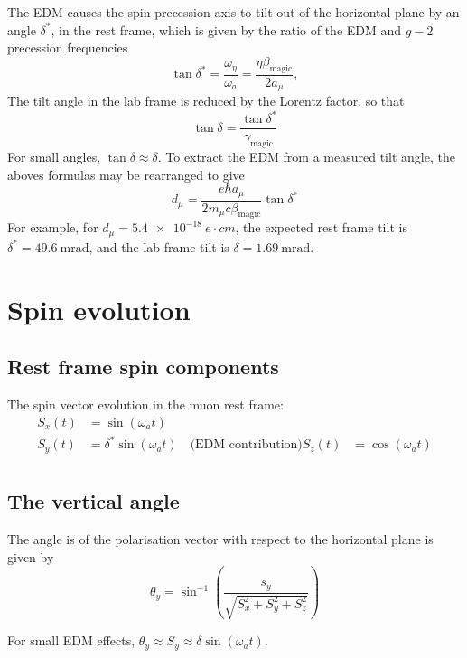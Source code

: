 \documentclass[11pt]{article}
\begin{document}
The EDM causes the spin precession axis to tilt out of the horizontal plane by an angle $\delta^{*}$, in the rest frame, which is given by the ratio of the EDM and $g-2$ precession frequencies
%
\begin{equation}
\tan \delta^{*} = \frac{\omega_\eta}{\omega_a} = \frac{\eta \beta_{\text{magic}}} { 2 a_\mu },
\end{equation}  
%
The tilt angle in the lab frame is reduced by the Lorentz factor, so that
%
\begin{equation}
\tan \delta = \frac{\tan \delta^{*}}{\gamma_{\text{magic}}} 
\end{equation}
%
For small angles, $\tan \delta \approx \delta$.
% 
To extract the EDM from a measured tilt angle, the aboves formulas may be rearranged to give
%
\begin{equation}
    \boxed{d_\mu = \frac{e \hbar a_\mu}{2 m_\mu c \beta_{\text{magic}}} \tan \delta^{*}}
\end{equation}
%
For example, for $d_\mu = \SI{5.4e-18}{e \cdot cm}$, the expected rest frame tilt is $\delta^{*} = \SI{49.6}{\milli\radian}$, and the lab frame tilt is $\delta = \SI{1.69}{\milli\radian}$.

\section{Spin evolution}

\subsection{Rest frame spin components}
%
The spin vector evolution in the muon rest frame:
\begin{align}
S_x(t) &= \sin(\omega_a t) \\
S_y(t) &= \delta^{*} \sin(\omega_a t) \quad \text{(EDM contribution)}
S_z(t) &= \cos(\omega_a t) \\ 
\end{align}
%

\subsection{The vertical angle}
%
The angle is of the polarisation vector with respect to the horizontal plane is given by
\begin{equation}
\theta_y = \sin^{-1}\left(\frac{s_y}{\sqrt{S_x^2 + S_y^2 + S_z^2}}\right)
\end{equation}

For small EDM effects, $\theta_y \approx S_y \approx \delta \sin(\omega_a t)$.
\end{document}
